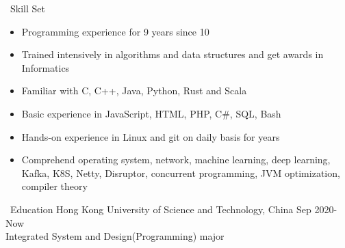 \documentclass{resume} %
\begin{document}

\begin{rSection}{\faCogs~Skill Set}
    \begin{itemize}
        \itemsep -0.5em \vspace{-0.5em}
        \item Programming experience for 9 years since 10
        \item Trained intensively in algorithms and data structures and get awards in Informatics
        \item Familiar with C, C++, Java, Python, Rust and Scala
        \item Basic experience in JavaScript, HTML, PHP, C\#, SQL, Bash
        \item Hands-on experience in Linux and git on daily basis for years
        \item Comprehend operating system, network, machine learning, deep learning, Kafka, K8S, Netty, Disruptor, concurrent programming, JVM optimization, compiler theory
    \end{itemize}
    
\end{rSection}

\begin{rSection}{\faGraduationCap~Education}
    Hong Kong University of Science and Technology, China \hfill Sep 2020-Now \\ Integrated System and Design(Programming) major
\end{rSection}
\end{document}
